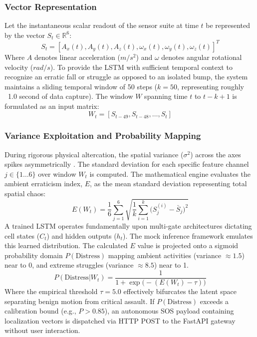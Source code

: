 \documentclass[10pt,journal,compsoc]{IEEEtran}
\begin{document}
\subsubsection{Vector Representation} Let the instantaneous scalar readout of the sensor suite at time $t$ be represented by the vector $S_t \in \mathbb{R}^6$:
\begin{equation}
S_t = [A_x(t), A_y(t), A_z(t), \omega_x(t), \omega_y(t), \omega_z(t)]^T
\end{equation}
Where $A$ denotes linear acceleration ($m/s^2$) and $\omega$ denotes angular rotational velocity ($rad/s$). To provide the LSTM with sufficient temporal context to recognize an erratic fall or struggle as opposed to an isolated bump, the system maintains a sliding temporal window of 50 steps ($k = 50$, representing roughly ~1.0 second of data capture). The window $W$ spanning time $t$ to $t-k+1$ is formulated as an input matrix:
\begin{equation}
W_t = [S_{t-49}, S_{t-48}, \dots, S_t]
\end{equation}

\subsubsection{Variance Exploitation and Probability Mapping} 
During rigorous physical altercation, the spatial variance ($\sigma^2$) across the axes spikes asymmetrically \cite{wu2018}. The standard deviation for each specific feature channel $j \in \{1 \dots 6\}$ over window $W_t$ is computed. The mathematical engine evaluates the ambient erraticism index, $E$, as the mean standard deviation representing total spatial chaos:
\begin{equation}
E(W_t) = \frac{1}{6} \sum_{j=1}^{6} \sqrt{ \frac{1}{k} \sum_{i=1}^{k} \big(S_{j}^{(i)} - \bar{S}_j\big)^2 }
\end{equation}
A trained LSTM operates fundamentally upon multi-gate architectures dictating cell states ($C_t$) and hidden outputs ($h_t$). The mock inference framework emulates this learned distribution. The calculated $E$ value is projected onto a sigmoid probability domain $P(\text{Distress})$ mapping ambient activities (variance $\approx 1.5$) near to 0, and extreme struggles (variance $\approx 8.5$) near to 1.
\begin{equation}
P(\text{Distress} | W_t) = \frac{1}{1 + \exp\big(-(E(W_t) - \tau)\big)}
\end{equation}
Where the empirical threshold $\tau = 5.0$ effectively bifurcates the latent space separating benign motion from critical assault. If $P(\text{Distress})$ exceeds a calibration bound (e.g., $P > 0.85$), an autonomous SOS payload containing localization vectors is dispatched via HTTP POST to the FastAPI gateway without user interaction.
\end{document}
